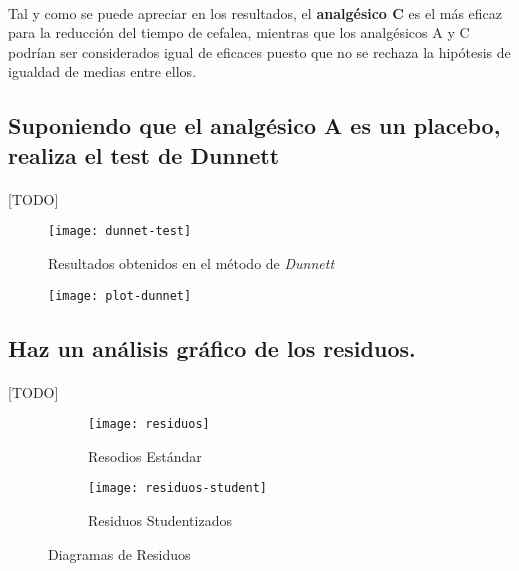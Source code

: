 \documentclass[11pt]{article}
\begin{document}
      \paragraph{}
      Tal y como se puede apreciar en los resultados, el \textbf{analgésico C} es el más eficaz para la reducción del tiempo de cefalea, mientras que los analgésicos A y C podrían ser considerados igual de eficaces puesto que no se rechaza la hipótesis de igualdad de medias entre ellos.

    \subsection{Suponiendo que el analgésico A es un placebo, realiza el test de Dunnett}

      \paragraph{}
      [TODO]


      \begin{figure}[!h]
        \centering
        \texttt{[image: dunnet-test]}
        \caption{Resultados obtenidos en el método de \emph{Dunnett}}
        \label{fig:1f1b-anova-dunnet-results}
      \end{figure}

      \begin{figure}[!h]
        \centering
        \texttt{[image: plot-dunnet]}
        \caption{}
        \label{}
      \end{figure}


    \subsection{Haz un análisis gráfico de los residuos.}

      \paragraph{}
      [TODO]

      \begin{figure}[!h]
        \centering
        \begin{subfigure}{.5\textwidth}
          \centering
          \texttt{[image: residuos]}
          \caption{Resodios Estándar}
          \label{fig:sub1}
        \end{subfigure}%
        \begin{subfigure}{.5\textwidth}
          \centering
          \texttt{[image: residuos-student]}
          \caption{Residuos Studentizados}
          \label{fig:sub2}
        \end{subfigure}
        \caption{Diagramas de Residuos}
        \label{fig:test}
      \end{figure}
\end{document}
